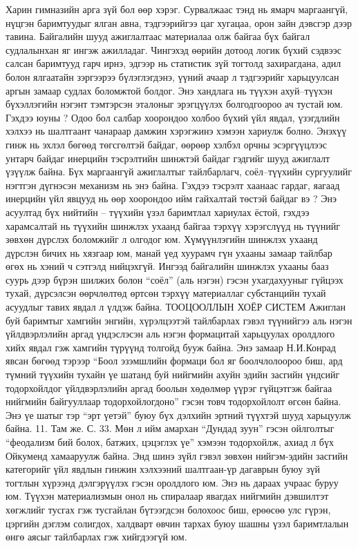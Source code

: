 Харин гимназийн арга зүй бол өөр хэрэг. Сурвалжаас тэнд нь ямарч маргаангүй, нүцгэн баримтуудыг ялган авна, тэдгээрийгээ цаг хугацаа, орон зайн дэвсгэр дээр тавина. Байгалийн шууд ажиглалтаас материалаа олж байгаа бүх байгал судлалынхан яг ингэж ажилладаг. Чингэхэд өөрийн дотоод логик бүхий сэдвээс салсан баримтууд гарч ирнэ, эдгээр нь статистик зүй тогтолд захирагдана, адил болон ялгаатайн зэргээрээ бүлэглэгдэнэ, үүний ачаар л тэдгээрийг харьцуулсан аргын замаар судлах боломжтой болдог.
Энэ хандлага нь түүхэн ахуй–түүхэн бүхэллэгийн нэгэнт тэмтэрсэн эталоныг эрэгцүүлэх болгодгоороо ач тустай юм. Гэхдээ юуны ? Одоо бол салбар хоорондоо холбоо бүхий үйл явдал, үзэгдлийн хэлхээ нь шалтгаант чанараар дамжин хэрэгжинэ хэмээн хариулж болно. Энэхүү гинж нь эхлэл бөгөөд төгсгөлтэй байдаг, өөрөөр хэлбэл орчны эсэргүүцлээс унтарч байдаг инерцийн тэсрэлтийн шинжтэй байдаг гэдгийг шууд ажиглалт үзүүлж байна. Бүх маргаангүй ажиглалтыг тайлбарлагч, соёл–түүхийн сургуулийг нэгтгэн дүгнэсэн механизм нь энэ байна.
Гэхдээ тэсрэлт хаанаас гардаг, яагаад инерцийн үйл явцууд нь өөр хоорондоо ийм гайхалтай төстэй байдаг вэ ? Энэ асуултад бүх нийтийн – түүхийн үзэл баримтлал хариулах ёстой, гэхдээ харамсалтай нь түүхийн шинжлэх ухаанд байгаа тэрхүү хэрэгслүүд нь түүнийг зөвхөн дүрслэх боломжийг л олгодог юм. Хүмүүнлэгийн шинжлэх ухаанд дүрслэн бичих нь хязгаар юм, манай үед хуурамч гүн ухааны замаар тайлбар өгөх нь хэний ч сэтгэлд нийцэхгүй. Ингээд байгалийн шинжлэх ухааны бааз суурь дээр бүрэн шилжих болон “соёл” (аль нэгэн) гэсэн ухагдахууныг гүйцээх тухай, дүрсэлсэн өөрчлөлтөд өртсөн тэрхүү материаллаг субстанцийн тухай асуудлыг тавих явдал л үлдэж байна.
ТООЦООЛЛЫН ХОЁР СИСТЕМ
Ажиглан буй баримтыг хамгийн энгийн, хүрэлцээтэй тайлбарлах гэвэл түүнийгээ аль нэгэн үйлдвэрлэлийн аргад үндэслэсэн аль нэгэн формацитай харьцуулах оролдлого хийх явдал гэж хамгийн түрүүнд толгойд бууж байна. Энэ замаар Н.И.Конрад явсан бөгөөд тэрээр “Боол эзэмшлийн формаци бол яг боолчлолоороо биш, ард түмний түүхийн тухайн үе шатанд буй нийгмийн ахуйн эдийн засгийн үндсийг тодорхойлдог үйлдвэрлэлийн аргад боолын хөдөлмөр үүрэг гүйцэтгэж байгаа нийгмийн байгууллаар тодорхойлогдоно” гэсэн товч тодорхойлолт өгсөн байна. Энэ үе шатыг тэр “эрт үетэй” буюу бүх дэлхийн эртний түүхтэй шууд харьцуулж байна. 11. Там же. С. 33.
Мөн л ийм амархан “Дундад зуун” гэсэн ойлголтыг “феодализм бий болох, батжих, цэцэглэх үе” хэмээн тодорхойлж, ахиад л бүх Ойкуменд хамааруулж байна. Энд шинэ зүйл гэвэл зөвхөн нийгэм-эдийн засгийн категорийг үйл явдлын гинжин хэлхээний шалтгаан-үр дагаврын буюу зүй тогтлын хүрээнд дэлгэрүүлэх гэсэн оролдлого юм. Энэ нь дараах учраас буруу юм. Түүхэн материализмын онол нь спиралаар явагдах нийгмийн дэвшилтэт хөгжлийг тусгах гэж тусгайлан бүтээгдсэн болохоос биш, ерөөсөө улс гүрэн, цэргийн дэглэм солигдох, халдварт өвчин тархах буюу шашны үзэл баримтлалын өнгө аясыг тайлбарлах гэж хийгдээгүй юм.
